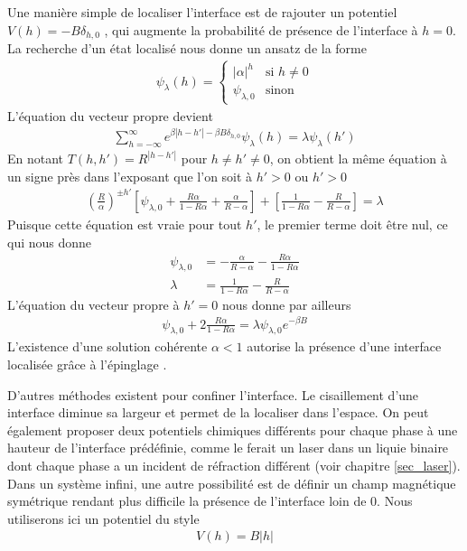 Une manière simple de localiser l'interface est de rajouter un potentiel $V(h) = -B \delta_{h,0}$ \cite{chui_pinning_1999,chalker_pinning_1981,chalker_pinning_1982}, qui augmente la probabilité de présence de l'interface à $h=0$. La recherche d'un état localisé nous donne un ansatz de la forme 
\begin{align}
	\psi_\lambda(h) = \begin{cases} |\alpha|^h & \text{si } h \neq 0 \\ \psi_{\lambda,0} & \text{sinon} \end{cases} 
\end{align}
L'équation du vecteur propre devient
\begin{align}
	\sum_{h=-\infty}^\infty e^{\beta |h-h'|- \beta B \delta_{h,0}} \psi_\lambda(h) = \lambda \psi_\lambda(h')
\end{align}
En notant $T(h,h') = R^{|h-h'|}$ pour $h \neq h' \neq 0$,  on obtient la même équation à un signe près dans l'exposant que l'on soit à $h'>0$ ou $h'>0$
\begin{align}
	\left( \frac{R}{\alpha} \right)^{\pm h'} \left[ \psi_{\lambda,0} + \frac{R \alpha}{1 - R \alpha} + \frac{\alpha}{R - \alpha} \right] + \left[ \frac{1}{1-R \alpha} - \frac{R}{R-\alpha} \right] = \lambda
\end{align}
Puisque cette équation est vraie pour tout $h'$, le premier terme doit être nul, ce qui nous donne
\begin{align}
	\psi_{\lambda,0} &= - \frac{\alpha}{R-\alpha}-\frac{R \alpha}{1-R \alpha} \\
	\lambda &= \frac{1}{1-R \alpha} - \frac{R}{R-\alpha}
\end{align}
L'équation du vecteur propre à $h'=0$ nous donne par ailleurs 
\begin{align}
	\psi_{\lambda,0} + 2 \frac{R \alpha}{1-R \alpha} = \lambda \psi_{\lambda,0} e^{-\beta B}
\end{align}
L'existence d'une solution cohérente $\alpha \less 1$ autorise la présence d'une interface localisée grâce à l'épinglage \cite{burkhardt_localisation-delocalisation_1981,kroll_solid--solid_1981,kroll_pinning_1982,kroll_interface_1983}.

D'autres méthodes existent pour confiner l'interface. Le cisaillement d'une interface diminue sa largeur et permet de la localiser dans l'espace. On peut également proposer deux potentiels chimiques différents pour chaque phase à une hauteur de l'interface prédéfinie, comme le ferait un laser dans un liquie binaire dont chaque phase  a un incident de réfraction différent \cite{casner_laser-induced_2003,delville_laser_2009} (voir chapitre \ref{sec_laser}). Dans un système infini, une autre possibilité est de définir un champ magnétique symétrique rendant plus difficile la présence de l'interface loin de $0$. Nous utiliserons ici un potentiel du style
\begin{align}
		  V(h) = B |h|
\end{align}

